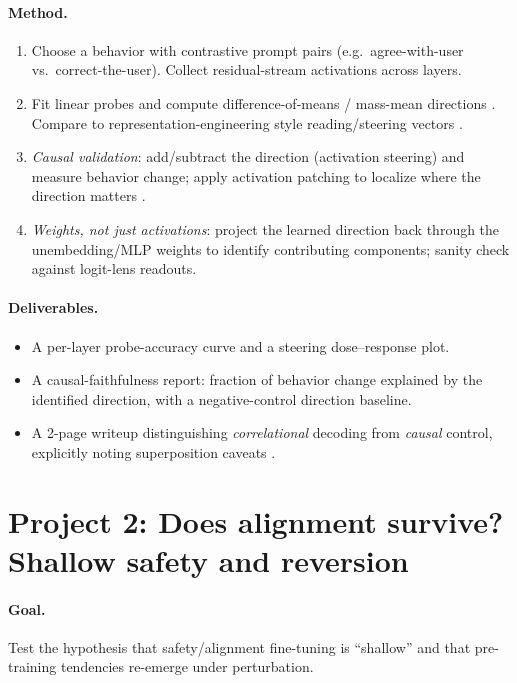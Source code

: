 \documentclass[11pt]{article}
\begin{document}
\paragraph{Method.}
\begin{enumerate}[leftmargin=1.5em]
  \item Choose a behavior with contrastive prompt pairs (e.g.\ agree-with-user
  vs.\ correct-the-user). Collect residual-stream activations across layers.
  \item Fit linear probes and compute difference-of-means / mass-mean directions
  \citep{marks2023geometry}. Compare to representation-engineering style
  reading/steering vectors \citep{zou2023representation}.
  \item \emph{Causal validation}: add/subtract the direction (activation
  steering) and measure behavior change; apply activation patching to localize
  where the direction matters \citep{meng2022locating,zou2023representation}.
  \item \emph{Weights, not just activations}: project the learned direction back
  through the unembedding/MLP weights to identify contributing components; sanity
  check against logit-lens readouts.
\end{enumerate}

\paragraph{Deliverables.}
\begin{itemize}[leftmargin=1.5em]
  \item A per-layer probe-accuracy curve and a steering dose--response plot.
  \item A causal-faithfulness report: fraction of behavior change explained by
  the identified direction, with a negative-control direction baseline.
  \item A 2-page writeup distinguishing \emph{correlational} decoding from
  \emph{causal} control, explicitly noting superposition caveats
  \citep{elhage2022superposition}.
\end{itemize}

\section*{Project 2: Does alignment survive? Shallow safety and reversion}

\paragraph{Goal.} Test the hypothesis that safety/alignment fine-tuning is
``shallow'' and that pre-training tendencies re-emerge under perturbation.
\end{document}

